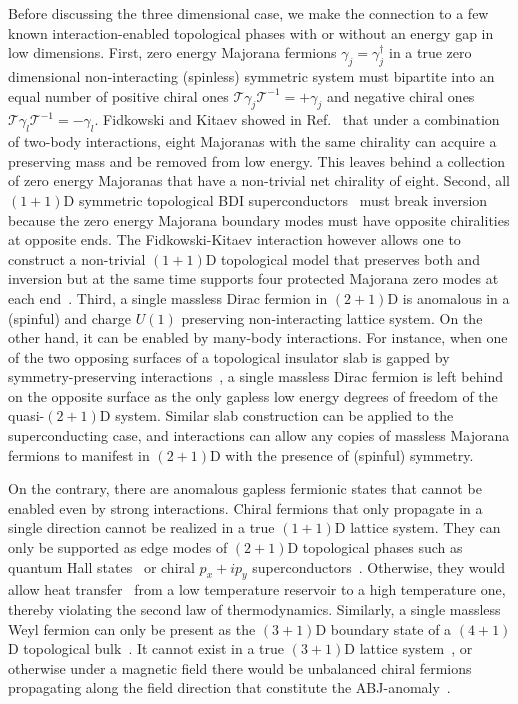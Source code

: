 Before discussing the three dimensional case, we make the connection to a few known interaction-enabled topological phases with or without an energy gap in low dimensions. First, zero energy Majorana fermions $\gamma_j=\gamma_j^\dagger$ in a true zero dimensional non-interacting (spinless) \TR symmetric system must bipartite into an equal number of positive chiral ones $\mathcal{T}\gamma_j\mathcal{T}^{-1}=+\gamma_j$ and negative chiral ones $\mathcal{T}\gamma_l\mathcal{T}^{-1}=-\gamma_l$. Fidkowski and Kitaev showed in Ref.~\cite{FidkowskiKitaev10} that under a combination of two-body interactions, eight Majoranas with the same chirality can acquire a \TR preserving mass and be removed from low energy. This leaves behind a collection of zero energy Majoranas that have a non-trivial net chirality of eight. Second, all $(1+1)$D \TR symmetric topological BDI superconductors~\cite{SchnyderRyuFurusakiLudwig08,Kitaevtable08,QiHughesRaghuZhang09,HasanKane10,QiZhangreview11,RMP} must break inversion because the zero energy Majorana boundary modes must have opposite chiralities at opposite ends. The Fidkowski-Kitaev interaction however allows one to construct a non-trivial $(1+1)$D topological model that preserves both \TR and inversion but at the same time supports four protected Majorana zero modes at each end~\cite{LapaTeoHughes14}. Third, a single massless Dirac fermion in $(2+1)$D is anomalous in a (spinful) \TR and charge $U(1)$ preserving non-interacting lattice system. On the other hand, it can be enabled by many-body interactions. For instance, when one of the two opposing surfaces of a topological insulator slab is gapped by symmetry-preserving interactions~\cite{WangPotterSenthilgapTI13,MetlitskiKaneFisher13b,ChenFidkowskiVishwanath14,BondersonNayakQi13}, a single massless Dirac fermion is left behind on the opposite surface as the only gapless low energy degrees of freedom of the quasi-$(2+1)$D system. Similar slab construction can be applied to the superconducting case, and interactions can allow any copies of massless Majorana fermions to manifest in $(2+1)$D with the presence of (spinful) \TR symmetry.

On the contrary, there are anomalous gapless fermionic states that cannot be enabled even by strong interactions. Chiral fermions that only propagate in a single direction cannot be realized in a true $(1+1)$D lattice system. They can only be supported as edge modes of $(2+1)$D topological phases such as quantum Hall states~\cite{Wenedgereview} or chiral $p_x+ip_y$ superconductors~\cite{Volovik99,ReadGreen}. Otherwise, they would allow heat transfer~\cite{KaneFisher97,Cappelli01,Kitaev06} from a low temperature reservoir to a high temperature one, thereby violating the second law of thermodynamics. Similarly, a single massless Weyl fermion can only be present as the $(3+1)$D boundary state of a $(4+1)$D topological bulk~\cite{ZhangHu01,BernevigChernHuToumbasZhang02,QiHughesZhang08,SchnyderRyuFurusakiLudwig08,Kitaevtable08}. It cannot exist in a true $(3+1)$D lattice system~\cite{Nielsen_Ninomiya_1981,NielsenNinomiyaPLB1981}, or otherwise under a magnetic field there would be unbalanced chiral fermions propagating along the field direction that constitute the ABJ-anomaly~\cite{Adler69,BellJackiw69,NielsenNinomiya83}.

